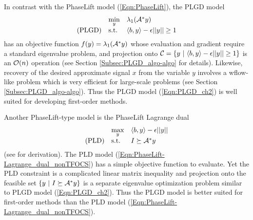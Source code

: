 In contrast with the PhaseLift model (\ref{Eqn:PhaseLift}), the PLGD model 
\begin{equation} 			\label{Eqn:PLGD_ch2}
\begin{array}{lll}
	&	\min\limits_{\substack{y}}
		&	\lambda_1({\mathcal A}^* y)		\\
\textnormal{(PLGD)}
	&	\textnormal{s.t.}
		&	\langle b, y \rangle - \epsilon ||y|| \geq 1
\end{array}
\end{equation}
has an objective function $f(y) = \lambda_1({\mathcal A}^* y)$ whose evaluation and gradient require a standard eigenvalue problem, and projection onto ${\mathcal C} = \{y \ | \ \langle b, y \rangle - \epsilon ||y|| \geq 1\}$ is an ${\mathcal O}(n)$ operation (see Section \ref{Subsec:PLGD_algo-algo} for details).  Likewise, recovery of the desired approximate signal $x$ from the variable $y$ involves a wflow-like problem which is very efficient for large-scale problems (see Section \ref{Subsec:PLGD_algo-algo}).  Thus the PLGD model (\ref{Eqn:PLGD_ch2}) is well suited for developing first-order methods.

Another PhaseLift-type model is the PhaseLift Lagrange dual
\begin{equation} 			\label{Eqn:PhaseLift-Lagrange_dual_nonTFOCS}
\begin{array}{lll}
&	\max\limits_{\substack{y}}
					&	\langle b, y \rangle - \epsilon ||y||
						\\
\textnormal{(PLD)}
				&	\textnormal{s.t.}
					&	I \succeq {\mathcal A}^*y
\end{array}
\end{equation}
(see \cite[Chapter 5]{boyd2004convex} for derivation).  The PLD model (\ref{Eqn:PhaseLift-Lagrange_dual_nonTFOCS}) has a simple objective function to evaluate.  Yet the PLD constraint is a complicated linear matrix inequality and projection onto the feasible set $\{ y \ | \ I \succeq {\mathcal A}^*y \}$ is a separate eigenvalue optimization problem similar to PLGD model (\ref{Eqn:PLGD_ch2}).  Thus the PLGD model is better suited for first-order methods than the PLD model (\ref{Eqn:PhaseLift-Lagrange_dual_nonTFOCS}).



